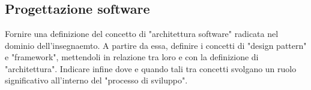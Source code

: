 \section{}

\subsection{Progettazione software}

\begin{question}
  Fornire una definizione del concetto di "architettura software" radicata nel
  dominio dell'insegnaemto. A partire da essa, definire i concetti di "design
  pattern" e "framework", mettendoli in relazione tra loro e con la
  definizione di "architettura". Indicare infine dove e quando tali tra concetti
  svolgano un ruolo significativo all'interno del "processo di sviluppo".
\end{question}

